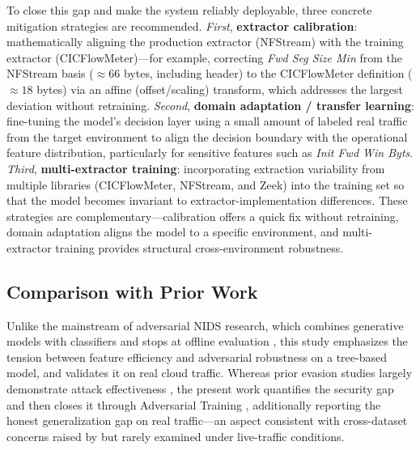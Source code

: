 \documentclass[11pt, a4paper]{article}
\begin{document}
To close this gap and make the system reliably deployable, three concrete mitigation strategies are recommended. \textit{First}, \textbf{extractor calibration}: mathematically aligning the production extractor (NFStream) with the training extractor (CICFlowMeter)---for example, correcting \textit{Fwd Seg Size Min} from the NFStream basis ($\approx 66$ bytes, including header) to the CICFlowMeter definition ($\approx 18$ bytes) via an affine (offset/scaling) transform, which addresses the largest deviation without retraining. \textit{Second}, \textbf{domain adaptation / transfer learning}: fine-tuning the model's decision layer using a small amount of labeled real traffic from the target environment to align the decision boundary with the operational feature distribution, particularly for sensitive features such as \textit{Init Fwd Win Byts}. \textit{Third}, \textbf{multi-extractor training}: incorporating extraction variability from multiple libraries (CICFlowMeter, NFStream, and Zeek) into the training set so that the model becomes invariant to extractor-implementation differences. These strategies are complementary---calibration offers a quick fix without retraining, domain adaptation aligns the model to a specific environment, and multi-extractor training provides structural cross-environment robustness.

\subsection{Comparison with Prior Work}
Unlike the mainstream of adversarial NIDS research, which combines generative models with classifiers and stops at offline evaluation \citep{ref_mari, ref_kumar, ref_park, ref_tmggan}, this study emphasizes the tension between feature efficiency and adversarial robustness on a tree-based model, and validates it on real cloud traffic. Whereas prior evasion studies largely demonstrate attack effectiveness \citep{ref_attackgan, ref_idsgan, ref_demgan}, the present work quantifies the security gap and then closes it through Adversarial Training \citep{ref_madry}, additionally reporting the honest generalization gap on real traffic---an aspect consistent with cross-dataset concerns raised by \citet{ref_crossgen} but rarely examined under live-traffic conditions.
\end{document}
